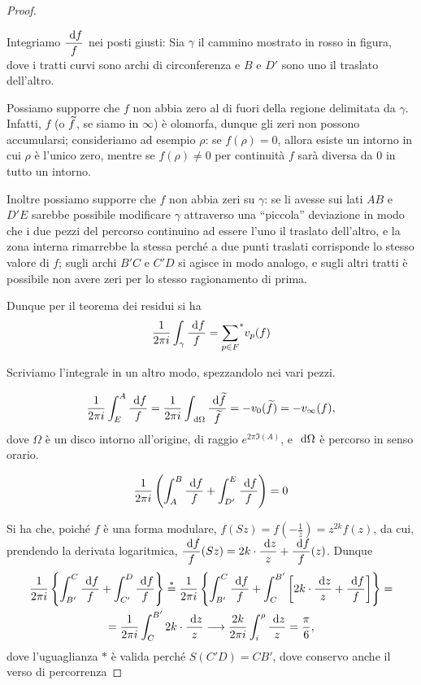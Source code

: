 \begin{proof}
	\begin{figure}
		
	\end{figure}
	Integriamo $\displaystyle \frac{\text{ d} f}{f}$ nei posti giusti: Sia $\gamma$ il cammino mostrato in rosso in figura, dove i tratti curvi sono archi di circonferenza e $B$ e $D'$ sono uno il traslato dell'altro.
	
	Possiamo supporre che $f$ non abbia zero al di fuori della regione delimitata da $\gamma$.
	Infatti, $f$ (o $\widetilde{f}$, se siamo in $\infty$) è olomorfa, dunque gli zeri non possono accumularsi; consideriamo ad esempio $\rho$: se $f(\rho)=0$, allora esiste un intorno in cui $\rho$ è l'unico zero, mentre se $f(\rho)\neq0$ per continuità $f$ sarà diversa da $0$ in tutto un intorno.
	
	Inoltre possiamo supporre che $f$ non abbia zeri su $\gamma$: se li avesse sui lati $AB$ e $D'E$ sarebbe possibile modificare $\gamma$ attraverso una ``piccola'' deviazione in modo che i due pezzi del percorso continuino ad essere l'uno il traslato dell'altro, e la zona interna rimarrebbe la stessa perché a due punti traslati corrisponde lo stesso valore di $f$; sugli archi $B'C$ e $C'D$ si agisce in modo analogo, e sugli altri tratti è possibile non avere zeri per lo stesso ragionamento di prima.
	
	Dunque per il teorema dei residui si ha
	\begin{equation}
		\frac{1}{2\pi i} \int_{\gamma} \frac{\text{ d} f}{f}={\sum_{p\in F}}^{*}v_p(f)
	\end{equation}
	
	Scriviamo l'integrale in un altro modo, spezzandolo nei vari pezzi.
	
	\begin{equation}
		\frac{1}{2\pi i}\int_E^A\frac{\text{ d} f}{f}=\frac{1}{2\pi i}\int_{\text{ d}\Omega}\frac{\text{ d} \widetilde{f}}{\widetilde{f}}=-v_0(\widetilde{f})=-v_\infty(f),
	\end{equation}
	dove $\Omega$ è un disco intorno all'origine, di raggio $e^{2\pi \Im(A)}$, e $\text{ d}\Omega$ è percorso in senso orario.
	
	\begin{equation}
		\frac{1}{2\pi i}\left( \int_A^B\frac{\text{ d} f}{f} + \int_{D'}^E\frac{\text{ d} f}{f} \right) =0
	\end{equation}
	
	Si ha che, poiché $f$ è una forma modulare, $f(Sz)=f(-\frac{1}{z})=z^{2k}f(z)$, da cui, prendendo la derivata logaritmica,
	$\displaystyle\frac{\text{ d} f}{f}(Sz)=2k\cdot\frac{\text{ d} z}{z}+\frac{\text{ d} f}{f}(z)$. Dunque
	\begin{multline}
		\frac{1}{2\pi i}\left\{ \int_{B'}^C\frac{\de f}{f} + \int_{C'}^D\frac{\de f}{f} \right\} \overset{*}{=} %
		\frac{1}{2\pi i}\left\{ \int_{B'}^C\frac{\de f}{f} + \int_{C}^{B'} \left[2k \cdot \frac{\de z}{z} + \frac{\de f}{f}\right] \right\} = \\
		= \frac{1}{2\pi i}\int_{C}^{B'} 2k \cdot \frac{\de z}{z} \longrightarrow \frac{2k}{2\pi i}\int_i^\rho \frac{\de z}{z} = \frac{\pi}{6},
	\end{multline}
	dove l'uguaglianza $*$ è valida perché $S(C'D)=CB'$, dove conservo anche il verso di percorrenza
	

\end{proof}
